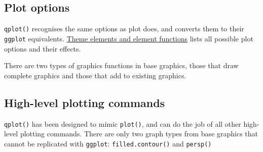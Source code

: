 \subsection{Plot options}

\texttt{qplot()} recognises the same options as plot does, and converts
them to their \texttt{ggplot} equivalents.
\hyperref[sec:themeux5felements]{Theme elements and element functions}
lists all possible plot options and their effects.

\begin{Shaded}
\begin{Highlighting}[]
 \NormalTok{, } \NormalTok{)}
\StringTok{ }\NormalTok{() +}\StringTok{ }
\StringTok{  }\NormalTok{(} \NormalTok{, } \NormalTok{)}
\end{Highlighting}
\end{Shaded}


There are two types of graphics functions in base graphics, those that
draw complete graphics and those that add to existing graphics.

\subsection{High-level plotting commands}

\texttt{qplot()} has been designed to mimic \texttt{plot()}, and can do
the job of all other high-level plotting commands. There are only two
graph types from base graphics that cannot be replicated with
\texttt{ggplot}: \texttt{filled.contour()} and \texttt{persp()}

